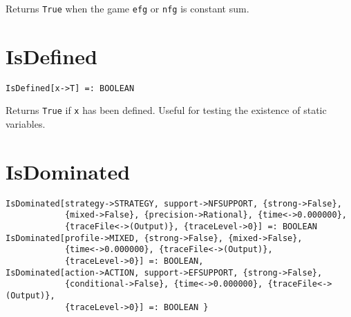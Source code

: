 \noindent
Returns \verb+True+ when the game \verb+efg+ or \verb+nfg+ is constant sum.


\section*{IsDefined}\label{PrimIsDefined}
\begin{verbatim}
IsDefined[x->T] =: BOOLEAN
\end{verbatim}
\foralltypes

\noindent
Returns \verb+True+ if \verb+x+ has been defined.  Useful for testing
the existence of static variables.


\section*{IsDominated}\label{PrimIsDominated}
\begin{verbatim}
IsDominated[strategy->STRATEGY, support->NFSUPPORT, {strong->False}, 
            {mixed->False}, {precision->Rational}, {time<->0.000000}, 
            {traceFile<->(Output)}, {traceLevel->0}] =: BOOLEAN
IsDominated[profile->MIXED, {strong->False}, {mixed->False}, 
            {time<->0.000000}, {traceFile<->(Output)}, 
            {traceLevel->0}] =: BOOLEAN,
IsDominated[action->ACTION, support->EFSUPPORT, {strong->False}, 
            {conditional->False}, {time<->0.000000}, {traceFile<->(Output)}, 
            {traceLevel->0}] =: BOOLEAN }
\end{verbatim}

